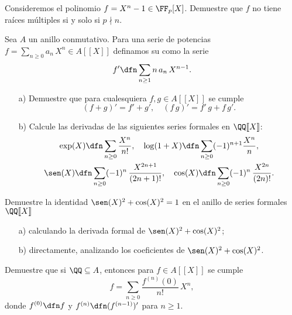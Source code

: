\begin{ejercicio}
  Consideremos el polinomio $f = X^n - 1 \in \FF_p [X]$. Demuestre que $f$ no
  tiene raíces múltiples si y solo si $p \nmid n$.
\end{ejercicio}

\begin{ejercicio}
  Sea $A$ un anillo conmutativo. Para una serie de potencias
  $f = \sum_{n \ge 0} a_n\,X^n \in A [\![X]\!]$ definamos su
   como la serie
  $$f' \dfn \sum_{n \ge 1} n\,a_n\,X^{n-1}.$$

  \begin{enumerate}
  \item[a)] Demuestre que para cualesquiera $f, g\in A[\![X]\!]$ se cumple
    $$(f+g)' = f' + g', \quad (f \, g)' = f' \, g + f \, g'.$$

  \item[b)] Calcule las derivadas de las siguientes series formales en
    $\QQ [\![X]\!]$:
    \begin{gather*}
      \exp (X) \dfn \sum_{n \ge 0} \frac{X^n}{n!}, \quad \log (1+X) \dfn \sum_{n \ge 0} (-1)^{n+1} \frac{X^n}{n},\\
      \sen (X) \dfn \sum_{n\ge 0} (-1)^n\,\frac{X^{2n+1}}{(2n+1)!}, \quad \cos (X) \dfn \sum_{n\ge 0} (-1)^n\,\frac{X^{2n}}{(2n)!}.
    \end{gather*}
  \end{enumerate}
\end{ejercicio}

\begin{ejercicio}
  Demuestre la identidad $\sen (X)^2 + \cos(X)^2 = 1$ en el anillo de series
  formales $\QQ [\![X]\!]$
  \begin{enumerate}
  \item[a)] calculando la derivada formal de $\sen (X)^2 + \cos(X)^2$;

  \item[b)] directamente, analizando los coeficientes de
    $\sen (X)^2 + \cos(X)^2$.
  \end{enumerate}
\end{ejercicio}

\begin{ejercicio}
  Demuestre que si $\QQ \subseteq A$, entonces para $f\in A [\![X]\!]$ se cumple
  $$f = \sum_{n \ge 0} \frac{f^{(n)} (0)}{n!}\,X^n,$$
  donde $f^{(0)} \dfn f$ y $f^{(n)} \dfn (f^{(n-1)})'$ para $n \ge 1$.
\end{ejercicio}

